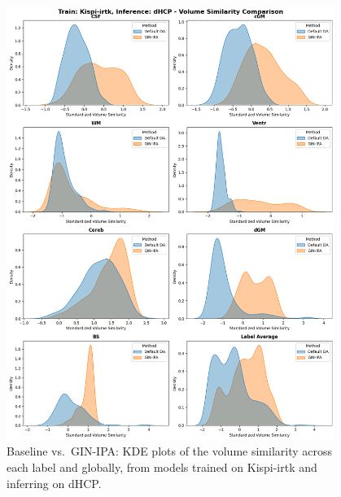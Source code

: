 \begin{figure}[htbp]
    \centering
    \includegraphics[width=0.95\textwidth]{figures/1_irtk-dhcp_VS.png}
    \caption{Baseline vs.\ GIN-IPA: KDE plots of the volume similarity across each label and globally, from models trained on Kispi-irtk and inferring on dHCP.}
    \label{fig:1_irtk_dhcp_VS}
\end{figure}

